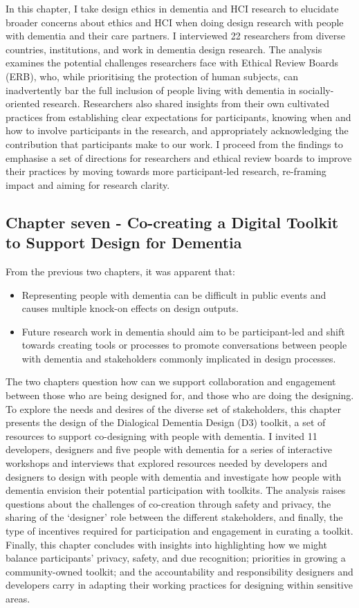 In this chapter, I take design ethics in dementia and HCI research to elucidate broader concerns about ethics and HCI when doing design research with people with dementia and their care partners. I interviewed 22 researchers from diverse countries, institutions, and work in dementia design research. The analysis examines the potential challenges researchers face with Ethical Review Boards (ERB), who, while prioritising the protection of human subjects, can inadvertently bar the full inclusion of people living with dementia in socially-oriented research. Researchers also shared insights from their own cultivated practices from establishing clear expectations for participants, knowing when and how to involve participants in the research, and appropriately acknowledging the contribution that participants make to our work. I proceed from the findings to emphasise a set of directions for researchers and ethical review boards to improve their practices by moving towards more participant-led research, re-framing impact and aiming for research clarity.

\subsection{Chapter seven - Co-creating a Digital Toolkit to Support Design for Dementia}
\label{Intro:ChapterSeven}
From the previous two chapters, it was apparent that: 
\begin{itemize}
\item Representing people with dementia can be difficult in public events and causes multiple knock-on effects on design outputs.
\item Future research work in dementia should aim to be participant-led and shift towards creating tools or processes to promote conversations between people with dementia and stakeholders commonly implicated in design processes.
\end{itemize}

The two chapters question how can we support collaboration and engagement between those who are being designed for, and those who are doing the designing. To explore the needs and desires of the diverse set of stakeholders, this chapter presents the design of the Dialogical Dementia Design (D3) toolkit, a set of resources to support co-designing with people with dementia. I invited 11 developers, designers and five people with dementia for a series of interactive workshops and interviews that explored resources needed by developers and designers to design with people with dementia and investigate how people with dementia envision their potential participation with toolkits. The analysis raises questions about the challenges of co-creation through safety and privacy, the sharing of the ‘designer’ role between the different stakeholders, and finally, the type of incentives required for participation and engagement in curating a toolkit. Finally, this chapter concludes with insights into highlighting how we might balance participants' privacy, safety, and due recognition; priorities in growing a community-owned toolkit; and the accountability and responsibility designers and developers carry in adapting their working practices for designing within sensitive areas.

